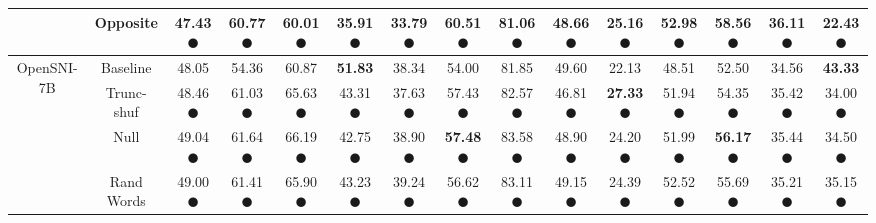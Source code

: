 \begin{table}[t]
{\begin{tabular}{@{}ccccccccccccccc@{}}
& Opposite & \textbf{47.43} \textcolor{green!60!black}{$\CIRCLE$} & 60.77 \textcolor{green!60!black}{$\CIRCLE$} & \textbf{60.01} \textcolor{green!60!black}{$\CIRCLE$} & 35.91 \textcolor{green!60!black}{$\CIRCLE$} & \textbf{33.79} \textcolor{green!60!black}{$\CIRCLE$} & 60.51 \textcolor{green!60!black}{$\CIRCLE$} & 81.06 \textcolor{red!60!black}{$\CIRCLE$} & 48.66 \textcolor{green!60!black}{$\CIRCLE$} & 25.16 \textcolor{red!60!black}{$\CIRCLE$} & 52.98 \textcolor{green!60!black}{$\CIRCLE$} & \textbf{58.56} \textcolor{green!60!black}{$\CIRCLE$} & 36.11 \textcolor{green!60!black}{$\CIRCLE$} & 22.43 \textcolor{green!60!black}{$\CIRCLE$} \\
\midrule
\multirow{5}{*}{OpenSNI-7B}
& Baseline & 48.05 & 54.36 & 60.87 & \textbf{51.83} & 38.34 & 54.00 & 81.85 & 49.60 & 22.13 & 48.51 & 52.50 & 34.56 & \textbf{43.33} \\
& Trunc-shuf & 48.46 \textcolor{green!60!black}{$\CIRCLE$} & 61.03 \textcolor{green!60!black}{$\CIRCLE$} & 65.63 \textcolor{green!60!black}{$\CIRCLE$} & 43.31 \textcolor{red!60!black}{$\CIRCLE$} & 37.63 \textcolor{red!60!black}{$\CIRCLE$} & 57.43 \textcolor{green!60!black}{$\CIRCLE$} & 82.57 \textcolor{green!60!black}{$\CIRCLE$} & 46.81 \textcolor{red!60!black}{$\CIRCLE$} & \textbf{27.33} \textcolor{green!60!black}{$\CIRCLE$} & 51.94 \textcolor{green!60!black}{$\CIRCLE$} & 54.35 \textcolor{green!60!black}{$\CIRCLE$} & 35.42 \textcolor{green!60!black}{$\CIRCLE$} & 34.00 \textcolor{red!60!black}{$\CIRCLE$} \\
& Null & 49.04 \textcolor{green!60!black}{$\CIRCLE$} & 61.64 \textcolor{green!60!black}{$\CIRCLE$} & 66.19 \textcolor{green!60!black}{$\CIRCLE$} & 42.75 \textcolor{red!60!black}{$\CIRCLE$} & 38.90 \textcolor{green!60!black}{$\CIRCLE$} & \textbf{57.48} \textcolor{green!60!black}{$\CIRCLE$} & 83.58 \textcolor{green!60!black}{$\CIRCLE$} & 48.90 \textcolor{red!60!black}{$\CIRCLE$} & 24.20 \textcolor{green!60!black}{$\CIRCLE$} & 51.99 \textcolor{green!60!black}{$\CIRCLE$} & \textbf{56.17} \textcolor{green!60!black}{$\CIRCLE$} & 35.44 \textcolor{green!60!black}{$\CIRCLE$} & 34.50 \textcolor{red!60!black}{$\CIRCLE$} \\
& Rand Words & 49.00 \textcolor{green!60!black}{$\CIRCLE$} & 61.41 \textcolor{green!60!black}{$\CIRCLE$} & 65.90 \textcolor{green!60!black}{$\CIRCLE$} & 43.23 \textcolor{red!60!black}{$\CIRCLE$} & 39.24 \textcolor{green!60!black}{$\CIRCLE$} & 56.62 \textcolor{green!60!black}{$\CIRCLE$} & 83.11 \textcolor{green!60!black}{$\CIRCLE$} & 49.15 \textcolor{red!60!black}{$\CIRCLE$} & 24.39 \textcolor{green!60!black}{$\CIRCLE$} & 52.52 \textcolor{green!60!black}{$\CIRCLE$} & 55.69 \textcolor{green!60!black}{$\CIRCLE$} & 35.21 \textcolor{green!60!black}{$\CIRCLE$} & 35.15 \textcolor{red!60!black}{$\CIRCLE$} \\

\end{tabular}}
\end{table}
